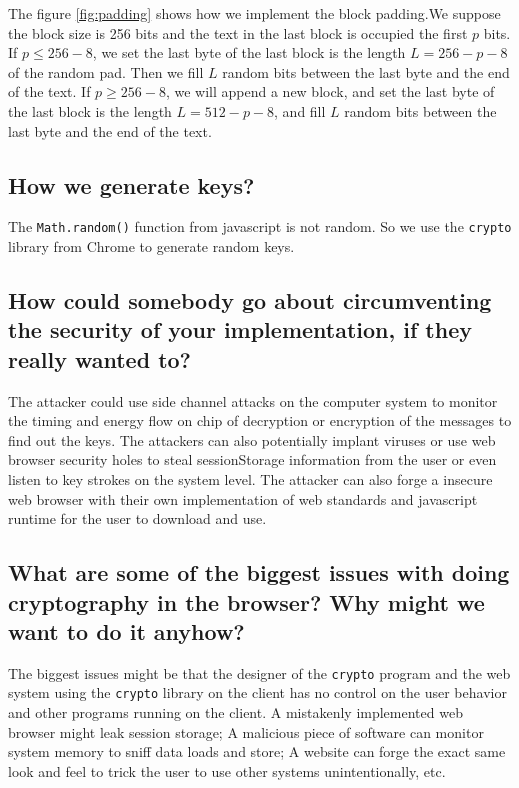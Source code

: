 The figure \ref{fig:padding} shows how we implement the block padding.We suppose the block size is 256 bits and the text in the last block is occupied the first $p$ bits. If $p \le 256 - 8$, we set the last byte of the last block is the length $L = 256 - p - 8$ of the random pad. Then we fill $L$ random bits between the last byte and the end of the text. 
If $p \ge 256 - 8$, we will append a new block, and set the last byte of the last block is the length $L = 512 - p - 8$, and fill $L$ random bits between the last byte and the end of the text. 

\subsection{How we generate keys?}
The \texttt{Math.random()} function from javascript is not random. So we use the \texttt{crypto} library from Chrome to generate random keys. 

\subsection{How could somebody go about circumventing the security of your implementation, if they really wanted to?}
The attacker could use side channel attacks on the computer system to monitor the timing and energy flow on chip of decryption or encryption of the messages to find out the keys. The attackers can also potentially implant viruses or use web browser security holes to steal sessionStorage information from the user or even listen to key strokes on the system level. The attacker can also forge a insecure web browser with their own implementation of web standards and javascript runtime for the user to download and use.

\subsection{What are some of the biggest issues with doing cryptography in the browser? Why might we want to do it anyhow?} 

The biggest issues might be that the designer of the \texttt{crypto} program and the web system using the \texttt{crypto} library on the client has no control on the user behavior and other programs running on the client. A mistakenly implemented web browser might leak session storage; A malicious piece of software can monitor system memory to sniff data loads and store; A website can forge the exact same look and feel to trick the user to use other systems unintentionally, etc.


